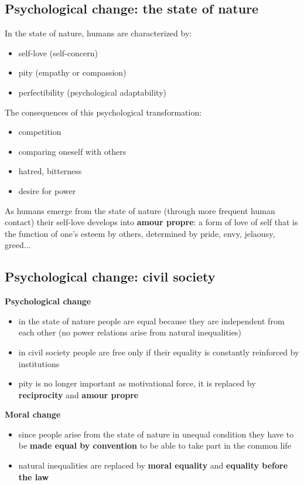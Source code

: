 \subsection{Psychological change: the state of nature}

In the state of nature, humans are characterized by:

\begin{itemize}
	\item self-love (self-concern)
	\item pity (empathy or compassion)
	\item perfectibility (psychological adaptability)
\end{itemize}

The consequences of this psychological transformation:

\begin{itemize}
	\item competition
	\item comparing oneself with others
	\item hatred, bitterness
	\item desire for power
\end{itemize}

As humans emerge from the state of nature (through more frequent human contact)
their self-love develops into \textbf{amour propre}: a form of love of self
that is the function of one's esteem by others, determined by pride, envy,
jelaousy, greed...

\subsection{Psychological change: civil society}

\textbf{Psychological change}

\begin{itemize}
	\item in the state of nature people are equal because they are
	independent from each other (no power relations arise from natural
	inequalities)
	\item in civil society people are free only if their equality is
	constantly reinforced by institutions
	\item pity is no longer important as motivational force, it is
	replaced by \textbf{reciprocity} and \textbf{amour propre}
\end{itemize}

\textbf{Moral change}

\begin{itemize}
	\item since people arise from the state of nature in unequal condition
	they have to be \textbf{made equal by convention} to be able to take
	part in the common life
	\item natural inequalities are replaced by \textbf{moral equality} and
	\textbf{equality before the law}
\end{itemize}

